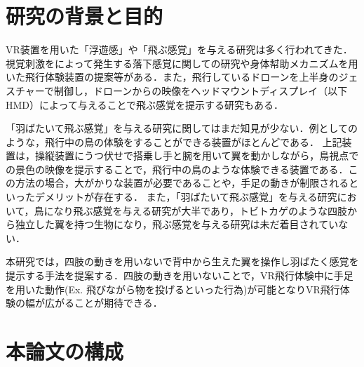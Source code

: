\section{研究の背景と目的}

        VR装置を用いた「浮遊感」や「飛ぶ感覚」を与える研究は多く行われてきた．視覚刺激をによって発生する落下感覚に関しての研究\cite{奥川夏輝2017VR空間における視覚刺激によって発生する落下感覚の分析}や身体幇助メカニズムを用いた飛行体験装置の提案\cite{鈴木拓馬2014hmd}等がある．また，飛行しているドローンを上半身のジェスチャーで制御し，ドローンからの映像をヘッドマウントディスプレイ（以下HMD）によって与えることで飛ぶ感覚を提示する研究\cite{rognon2018flyjacket}もある．


        「羽ばたいて飛ぶ感覚」を与える研究に関してはまだ知見が少ない．例としてのような，飛行中の鳥の体験をすることができる装置がほとんどである\cite{rheiner2014birdly}\cite{hypersuit}．
        上記装置は，操縦装置にうつ伏せで搭乗し手と腕を用いて翼を動かしながら，鳥視点での景色の映像を提示することで，飛行中の鳥のような体験できる装置である．この方法の場合，大がかりな装置が必要であることや，手足の動きが制限されるといったデメリットが存在する．
        また，「羽ばたいて飛ぶ感覚」を与える研究において，鳥になり飛ぶ感覚を与える研究が大半であり，トビトカゲのような四肢から独立した翼を持つ生物になり，飛ぶ感覚を与える研究は未だ着目されていない．

        本研究では，四肢の動きを用いないで背中から生えた翼を操作し羽ばたく感覚を提示する手法を提案する．四肢の動きを用いないことで，VR飛行体験中に手足を用いた動作(Ex. 飛びながら物を投げるといった行為)が可能となりVR飛行体験の幅が広がることが期待できる．


\section{本論文の構成}

